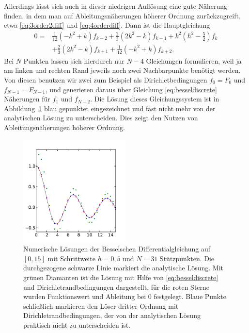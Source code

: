 Allerdings lässt sich auch in dieser niedrigen Auflösung eine gute
Näherung finden, in dem man auf Ableitungsnäherungen höherer Ordnung
zurückzugreift, etwa \eqref{eq:3order2diff} und
\eqref{eq:4orderdiff}. Dann ist die Hauptgleichung
\begin{align}
  0 = &\frac{1}{12}(-k^2 + k)f_{k-2}
  + \frac{2}{3}(2k^2 - k)f_{k-1}
  + k^2\left(h^2 - \frac{5}{2}\right)f_k\nonumber\\
  &+ \frac{2}{3}(2k^2 - k)f_{k+1}
  + \frac{1}{12}(-k^2 + k)f_{k+2}.
\end{align}
Bei $N$ Punkten lassen sich hierdurch nur $N-4$ Gleichungen
formulieren, weil ja am linken und rechten Rand jeweils noch zwei
Nachbarpunkte benötigt werden. Von diesen benutzen wir zwei zum
Beispiel als Dirichletbedingungen $f_0 = F_0$ und $f_{N-1} = F_{N-1}$,
und generieren daraus über Gleichung \eqref{eq:besseldiscrete}
Näherungen für $f_1$ und $f_{N-2}$. Die Lösung dieses Gleichungssystem
ist in Abbildung~\ref{fig:bessel_diff} blau gepunktet eingezeichnet
und fast nicht mehr von der analytischen Lösung zu unterscheiden. Dies
zeigt den Nutzen von Ableitungsnäherungen höherer Ordnung.

\begin{figure}[p]
  \centering
  \includegraphics[width=0.5\textwidth]{plots/bessel_diff}
  \caption{Numerische Lösungen der Besselschen Differentialgleichung
    auf $[0,15]$ mit Schrittweite $h=0,5$ und $N=31$ Stützpunkten. Die
    durchgezogene schwarze Linie markiert die analytische Lösung. Mit
    grünen Diamanten ist die Lösung mit Hilfe von
    \eqref{eq:besseldiscrete} und Dirichletrandbedingungen
    dargestellt, für die roten Sterne wurden Funktionswert und
    Ableitung bei $0$ festgelegt. Blaue Punkte schließlich markieren
    den Löser dritter Ordnung mit Dirichletrandbedingungen, der von
    der analytischen Lösung praktisch nicht zu unterscheiden ist.}
  \label{fig:bessel_diff}
\end{figure}

